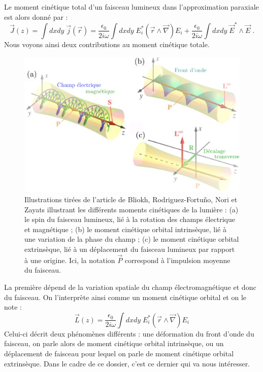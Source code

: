 \documentclass[a4paper,11pt]{article} %
\begin{document}
	Le moment cinétique total d'un faisceau lumineux dans l'approximation paraxiale est alors donné par :
	\begin{equation*}
		\vec{J} (z) = \int \! dx dy \; \vec{j}(\vec{r}) = \frac{\epsilon_0}{2 i \omega} \int \! dx dy \; E_i^* (\vec{r} \wedge \vec{\nabla} ) E_i + \frac{\epsilon_0}{2 i \omega} \int \! dx dy \; \vec{E}^* \! \wedge \vec{E} \; .
	\end{equation*}
	Nous voyons ainsi deux contributions au moment cinétique totale.\\
	
	\begin{figure}[h]
		\centering
		\begin{minipage}[c]{0.85\linewidth}
			\centering
			\includegraphics[width=0.9\linewidth]{./Illustrations/moments_angulaires}
			\caption{Illustrations tirées de l'article de Bliokh, Rodriguez-Fortuño, Nori et Zayats illustrant les différents moments cinétiques de la lumière : (a) le spin du faisceau lumineux, lié à la rotation des champs électrique et magnétique ; (b) le moment cinétique orbital intrinsèque, lié à une variation de la phase du champ ; (c) le moment cinétique orbital extrinsèque, lié à un déplacement du faisceau lumineux par rapport à une origine. Ici, la notation $ \vec{P} $ correspond à l'impulsion moyenne du faisceau.}
			\label{fig:moments_angulaires}
		\end{minipage}
	\end{figure}
	
	La première dépend de la variation spatiale du champ électromagnétique et donc du faisceau. On l'interprète ainsi comme un moment cinétique orbital et on le note :
	\begin{equation*}
		\vec{L}(z) = \frac{\epsilon_0}{2 i \omega} \int \! dx dy \; E_i^* (\vec{r} \wedge \vec{\nabla} ) E_i
	\end{equation*}
	Celui-ci décrit deux phénomènes différents : une déformation du front d'onde du faisceau, on parle alors de moment cinétique orbital intrinsèque, ou un déplacement de faisceau pour lequel on parle de moment cinétique orbital extrinsèque. Dans le cadre de ce dossier, c'est ce dernier qui va nous intéresser.\\
	
\end{document}
